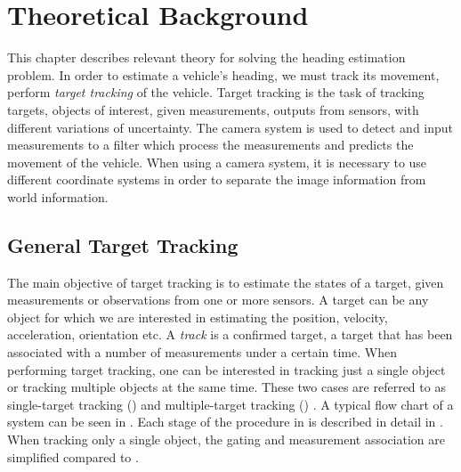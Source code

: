 \chapter{Theoretical Background}
\label{cha:theory}

This chapter describes relevant theory for solving the heading estimation problem.
In order to estimate a vehicle's heading, we must track its movement, \ie perform \textit{target tracking} of the vehicle.
Target tracking is the task of tracking targets, objects of interest, given measurements, outputs from sensors, with different variations of uncertainty.
The camera system is used to detect and input measurements to a filter which process the measurements and predicts the movement of the vehicle.
When using a camera system, it is necessary to use different coordinate systems in order to separate the image information from world information.

\section{General Target Tracking}
The main objective of target tracking is to estimate the states of a target, given measurements or observations from one or more sensors.
A target can be any object for which we are interested in estimating \eg the position, velocity, acceleration, orientation etc.
A \textit{track} is a confirmed target, \ie a target that has been associated with a number of measurements under a certain time.
When performing target tracking, one can be interested in tracking just a single object or tracking multiple objects at the same time.
These two cases are referred to as single-target tracking (\abbrSTT) and multiple-target tracking (\abbrMTT) \cite{Blackman:1999}.
A typical flow chart of a \abbrMTT system can be seen in .
Each stage of the procedure in  is described in detail in .
When tracking only a single object, the gating and measurement association are simplified compared to \abbrMTT.

